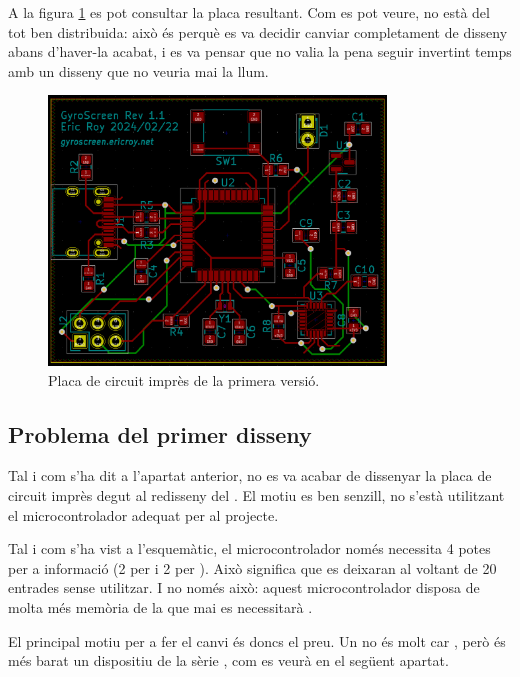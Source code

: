 A la figura \ref{fig:pcb_v1} es pot consultar la placa resultant. Com es pot veure,
no està del tot ben distribuida: això és perquè es va decidir canviar completament
de disseny abans d'haver-la acabat, i es va pensar que no valia la pena seguir
invertint temps amb un disseny que no veuria mai la llum.

\begin{figure}[ht]
    \centering
    \includegraphics[width=0.8\textwidth]{images/kicad/gyro1_pcb.png}
    \caption{Placa de circuit imprès de la primera versió.}
    \label{fig:pcb_v1}
\end{figure}

\subsection{Problema del primer disseny}

Tal i com s'ha dit a l'apartat anterior, no es va acabar de dissenyar la placa
de circuit imprès degut al redisseny del . El motiu es ben senzill,
no s'està utilitzant el microcontrolador adequat per al projecte.

Tal i com s'ha vist a l'esquemàtic, el microcontrolador només necessita 4 potes
per a informació (2 per  i 2 per ). Això significa que es
deixaran al voltant de 20 entrades sense utilitzar. I no només això: aquest
microcontrolador disposa de molta més memòria de la que mai es necessitarà
\cite{AtMega32u4}.

El principal motiu per a fer el canvi és doncs el preu. Un 
no és molt car \cite{AvrComparison}, però és més barat un dispositiu 
de la sèrie , com es veurà en el següent apartat.


